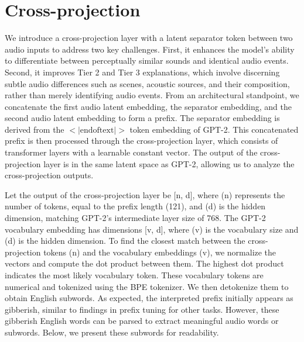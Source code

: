 \section{Cross-projection} \vspace{-0.1in} \label{appendix: cross-projection}
We introduce a cross-projection layer with a latent separator token between two audio inputs to address two key challenges. First, it enhances the model's ability to differentiate between perceptually similar sounds and identical audio events. Second, it improves Tier 2 and Tier 3 explanations, which involve discerning subtle audio differences such as scenes, acoustic sources, and their composition, rather than merely identifying audio events. From an architectural standpoint, we concatenate the first audio latent embedding, the separator embedding, and the second audio latent embedding to form a prefix. The separator embedding is derived from the $<\text{|endoftext|}>$ token embedding of GPT-2. This concatenated prefix is then processed through the cross-projection layer, which consists of transformer layers with a learnable constant vector. The output of the cross-projection layer is in the same latent space as GPT-2, allowing us to analyze the cross-projection outputs.

Let the output of the cross-projection layer be [n, d], where (n) represents the number of tokens, equal to the prefix length (121), and (d) is the hidden dimension, matching GPT-2’s intermediate layer size of 768. The GPT-2 vocabulary embedding has dimensions [v, d], where (v) is the vocabulary size and (d) is the hidden dimension. To find the closest match between the cross-projection tokens (n) and the vocabulary embeddings (v), we normalize the vectors and compute the dot product between them. The highest dot product indicates the most likely vocabulary token. These vocabulary tokens are numerical and tokenized using the BPE tokenizer. We then detokenize them to obtain English subwords. As expected, the interpreted prefix initially appears as gibberish, similar to findings in prefix tuning for other tasks. However, these gibberish English words can be parsed to extract meaningful audio words or subwords. Below, we present these subwords for readability.

